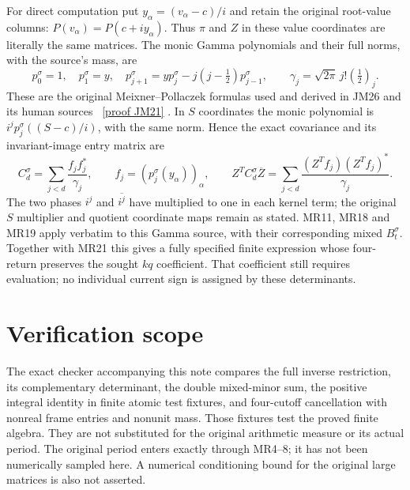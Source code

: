 \documentclass[11pt]{article}
\begin{document}
For direct computation put
$y_\alpha=(v_\alpha-c)/i$ and retain the original root-value columns:
$P(v_\alpha)=P(c+iy_\alpha)$. Thus $\pi$ and $Z$ in these value
coordinates are literally the same matrices. The monic Gamma
polynomials and their full norms, with the source's mass, are
\[
 p_0^\sigma=1,\quad p_1^\sigma=y,\quad
 p_{j+1}^\sigma=yp_j^\sigma-j(j-\tfrac12)p_{j-1}^\sigma,
 \qquad\gamma_j=\sqrt{2\pi}\,j!(\tfrac12)_j.\tag{MR22}
\]
These are the original Meixner--Pollaczek formulas used and derived in
JM26 and its human sources \cite{MP,JM}%
~\href{https://github.com/KokunoYumeto/zeta-function-research-reader/blob/5992ad50c0f2a06921f1fcaded7b4e38097c0739/workbenches/splitzero-tandem/continuations/20260920-original-kernel-mixed-determinants/providers/JOINT_MINIMUM_RECEIVERS.tex\#L286}{[proof JM21]}%
{}. In $S$ coordinates the monic
polynomial is $i^jp_j^\sigma((S-c)/i)$, with the same norm. Hence the
exact covariance and its invariant-image entry matrix are
\[
 C_d^\sigma=\sum_{j<d}\frac{f_jf_j^*}{\gamma_j},\qquad
 f_j=(p_j^\sigma(y_\alpha))_\alpha,\qquad
 Z^TC_d^\sigma\overline Z
      =\sum_{j<d}\frac{(Z^Tf_j)(Z^Tf_j)^*}{\gamma_j}.\tag{MR23}
\]
The two phases $i^j$ and $\overline{i^j}$ have multiplied to one in
each kernel term; the original $S$ multiplier and quotient coordinate
maps remain as stated. MR11, MR18 and MR19 apply verbatim to this
Gamma source, with their corresponding mixed $B_t^\sigma$.
Together with MR21 this gives a fully specified finite expression
whose four-return preserves the sought $kq$ coefficient. That
coefficient still requires evaluation; no individual current sign is
assigned by these determinants.

\section{Verification scope}
The exact checker accompanying this note compares the full inverse
restriction, its complementary determinant, the double mixed-minor
sum, the positive integral identity in finite atomic test fixtures,
and four-cutoff cancellation with nonreal frame entries and nonunit
mass. Those fixtures test the proved finite algebra. They are not
substituted for the original arithmetic measure or its actual period.
The original period enters exactly through MR4--8; it has not been
numerically sampled here. A numerical conditioning bound for the
original large matrices is also not asserted.
\end{document}
